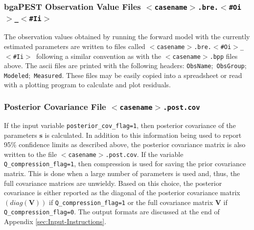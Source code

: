 \documentclass[11pt,oneside,onecolumn]{usgsreport}
\begin{document}
\begin{multicols}{2}
\subsubsection{bgaPEST Observation Value Files \texttt{$<$casename$>$.bre.$<$\#Oi$>$\_$<$\#Ii$>$}}

The observation values obtained by running the forward model with
the currently estimated parameters are written to files called \texttt{$<$casename$>$.bre.$<$\#Oi$>$\_$<$\#Ii$>$
}following a similar convention as with the \texttt{$<$casename$>$.bpp}
files above. The ascii files are printed with the following headers:
\texttt{ObsName};\texttt{ ObsGroup};\texttt{ Modeled};\texttt{ Measured}.
These files may be easily copied into a spreadsheet or read with a
plotting program to calculate and plot residuals.


\subsubsection{Posterior Covariance File \texttt{$<$casename$>$.post.cov}}

If the input variable \texttt{posterior\_cov\_flag=1}, then posterior
covariance of the parameters $\mathbf{s}$ is calculated. In addition
to this information being used to report 95\% confidence limits as
described above, the posterior covariance matrix is also written to
the file \texttt{$<$casename$>$.post.cov}. If the variable \texttt{Q\_compression\_flag=1},
then compression is used for saving the prior covariance matrix. This
is done when a large number of parameters is used and, thus, the full
covariance matrices are unwieldy. Based on this choice, the posterior
covariance is either reported as the diagonal of the posterior covariance
matrix $\left(diag\left(\mathbf{V}\right)\right)$ if \texttt{Q\_compression\_flag=1}
or the full covariance matrix $\mathbf{V}$ if \texttt{Q\_compression\_flag=0}.
The output formats are discussed at the end of Appendix \ref{sec:Input-Instructions}.

\end{multicols}
\end{document}
